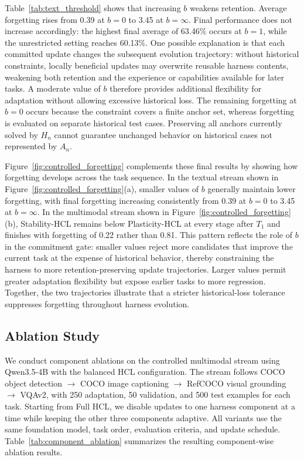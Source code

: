 \documentclass{article}
\begin{document}
Table~\ref{tab:text_threshold} shows that increasing $b$ weakens retention.
Average forgetting rises from 0.39 at $b=0$ to 3.45 at $b=\infty$. Final
performance does not increase accordingly: the highest final average of
63.46\% occurs at $b=1$, while the unrestricted setting reaches 60.13\%. One possible explanation is that each committed update changes the subsequent evolution trajectory: without historical constraints, locally beneficial updates may overwrite reusable harness contents, weakening both retention and the experience or capabilities available for later tasks. 
A moderate value of $b$ therefore provides additional flexibility for
adaptation without allowing excessive historical loss. The remaining
forgetting at $b=0$ occurs because the constraint covers a finite anchor set,
whereas forgetting is evaluated on separate historical test cases. Preserving
all anchors currently solved by $H_n$ cannot guarantee unchanged behavior on
historical cases not represented by $A_n$.


Figure~\ref{fig:controlled_forgetting} complements these final results by showing how forgetting develops across the task sequence. In the textual stream shown in Figure~\ref{fig:controlled_forgetting}(a), smaller values of $b$ generally maintain lower forgetting, with final forgetting increasing consistently from 0.39 at $b=0$ to 3.45 at $b=\infty$. In the multimodal stream shown in Figure~\ref{fig:controlled_forgetting}(b), Stability-HCL remains below Plasticity-HCL at every stage after $T_1$ and finishes with forgetting of 0.22 rather than 0.81. This pattern reflects the role of $b$ in the commitment gate: smaller values reject more candidates that improve the current task at the expense of historical behavior, thereby constraining the harness to more retention-preserving update trajectories. Larger values permit greater adaptation flexibility but expose earlier tasks to more regression. Together, the two trajectories illustrate that a stricter historical-loss tolerance suppresses forgetting throughout harness evolution.

\subsection{Ablation Study}
\label{sec:component_ablation}

We conduct component ablations on the controlled multimodal stream using
Qwen3.5-4B with the balanced HCL configuration. The stream follows COCO object detection $\rightarrow$ COCO image captioning $\rightarrow$ RefCOCO visual grounding $\rightarrow$ VQAv2, with 250 adaptation, 50 validation, and 500 test examples for each task. Starting
from Full HCL, we disable updates to one harness component at a time while
keeping the other three components adaptive. All variants use the same
foundation model, task order, evaluation criteria, and update schedule.
Table~\ref{tab:component_ablation} summarizes the resulting component-wise
ablation results.
\end{document}
